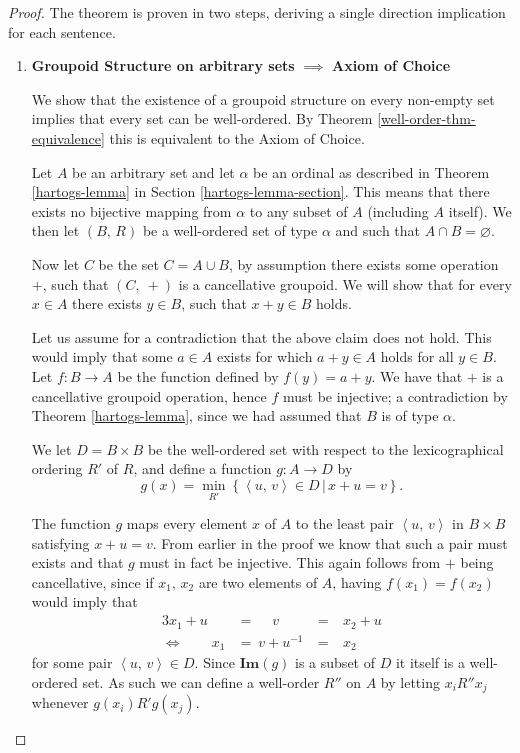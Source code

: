 \documentclass[../../main.tex]{subfiles}
\begin{document}
\begin{proof}
    The theorem is proven in two steps, deriving a single direction implication for each sentence.
    \begin{enumerate}
        \item \textbf{Groupoid Structure on arbitrary sets} $\implies$ \textbf{Axiom of Choice}
        
        We show that the existence of a groupoid structure on every non-empty set implies that every set can be well-ordered.
        By Theorem \ref{well-order-thm-equivalence} this is equivalent to the Axiom of Choice.

        Let $A$ be an arbitrary set and let $\alpha$ be an ordinal as described in Theorem \ref{hartogs-lemma} in Section \ref{hartogs-lemma-section}.
        This means that there exists no bijective mapping from $\alpha$ to any subset of $A$ (including $A$ itself).
        We then let $\left(B,\, R\right)$ be a well-ordered set of type $\alpha$ and such that $A \cap B = \varnothing$.
    
        Now let $C$ be the set $C = A \cup B$, by assumption there exists some operation $+$, such that $\left(C,\ +\right)$ is a cancellative groupoid. %
        We will show that for every $x \in A$ there exists $y \in B$, such that $x + y \in B$ holds.

        Let us assume for a contradiction that the above claim does not hold.
        This would imply that some $a \in A$ exists for which $a + y \in A$ holds for all $y \in B$.
        Let $f: B \to A$ be the function defined by $f(y) = a + y$.
        We have that $+$ is a cancellative groupoid operation, hence $f$ must be injective;
        a contradiction by Theorem \ref{hartogs-lemma}, since we had assumed that $B$ is of type $\alpha$.

        We let $D = B \times B$ be the well-ordered set with respect to the lexicographical ordering $R'$ of $R$,
        and define a function $g: A \to D$ by $$g(x) = \min_{R'} \left\{\left<u,\, v\right> \in D \,\vert\, x + u = v\right\}.$$
        
        The function $g$ maps every element $x$ of $A$ to the least pair $\left<u,\, v\right>$ in $B \times B$ satisfying $x + u = v$.
        From earlier in the proof we know that such a pair must exists and that $g$ must in fact be injective.
        This again follows from $+$ being cancellative, since if $x_1,\, x_2$ are two elements of $A$, having $f(x_1) = f(x_2)$ would imply that
        \begin{alignat*}{3}
                        x_1 + u  &= \quad \ v     &=& \ x_2 + u \\
            \iff \qquad x_1      &= \ v + u^{-1}\ &=& \ x_2     
        \end{alignat*} 
        for some pair $\left<u,\, v\right> \in D$.
        Since $\mathbf{Im}(g)$ is a subset of $D$ it itself is a well-ordered set.
        As such we can define a well-order $R''$ on $A$ by letting $x_i R'' x_j$ whenever $g(x_i) R' g(x_j)$.


\end{enumerate}
\end{proof}
\end{document}
